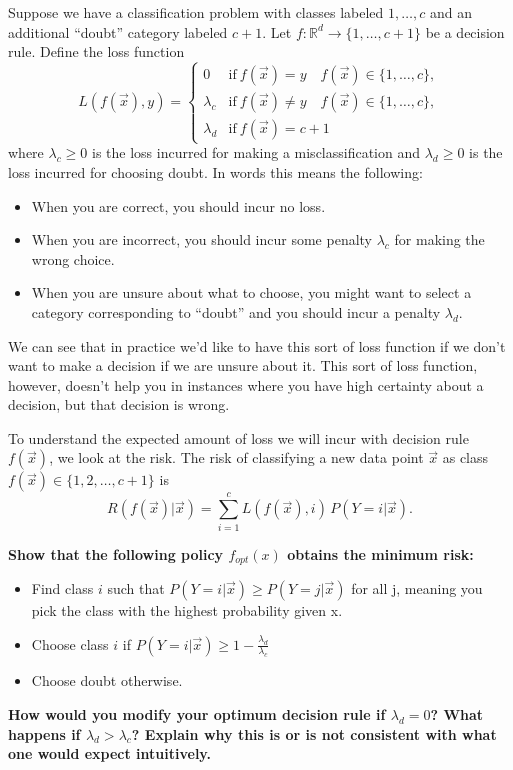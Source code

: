 \documentclass[preview]{standalone}
\begin{document}
Suppose we have a classification problem with classes labeled $1, \dotsc, c$ and an additional ``doubt'' category labeled $c+1$. Let $f : \mathbb{R}^d \to \{1, \dots, c+1 \}$ be a decision rule. Define the loss function
\begin{equation}
L(f(\vec{x}), y) =
\begin{cases}
0 &  						 \mathrm{if}\ f(\vec{x})=y \quad f(\vec{x}) \in\{1,\dotsc,c\}, \\
\lambda_c       & \mathrm{if}\ f(\vec{x})\neq y \quad f(\vec{x}) \in \{1,\dotsc,c\}, \\
\lambda_d       & \mathrm{if}\ f(\vec{x})=c+1
\end{cases}
\end{equation}
where $\lambda_c \geq 0$ is the loss incurred for making a misclassification and $\lambda_d \geq 0$ is the loss incurred for choosing doubt. In words this means the following:
\begin{itemize}
	\item When you are correct, you should incur no loss.
	\item When you are incorrect, you should incur some penalty $\lambda_c$ for making the wrong choice.
	\item When you are unsure about what to choose, you might want to select a category corresponding to ``doubt'' and you should incur a penalty $\lambda_d$.
\end{itemize}

We can see that in practice we'd like to have this sort of loss
function if we don't want to make a decision if we are unsure about
it. This sort of loss function, however, doesn't help you in instances
where you have high certainty about a decision, but that decision is wrong.

To understand the expected amount of loss we will incur with decision rule $f(\vec{x})$, we look at the risk. The risk of classifying a new data point $\vec{x}$ as class $f(\vec{x}) \in \{1,2,\dots,c+1\}$ is
$$R(f(\vec{x})|\vec{x}) = \sum_{i=1}^{c} L(f(\vec{x}), i) \, P(Y=i|\vec{x}).$$

\begin{Parts}

	\Part \textbf{Show that the following policy $f_{opt}(x)$ obtains the minimum risk:}
	\begin{itemize}
		\item Find class $i$ such that $P(Y=i|\vec{x}) \geq P(Y=j|\vec{x})$ for all j, meaning you pick the class with the highest probability given x.
		\item Choose class $i$ if $P(Y=i|\vec{x}) \geq 1 - \frac{\lambda_d}{\lambda_c}$ 
		\item Choose doubt otherwise.
	\end{itemize}

	

	\Part \textbf{How would you modify your optimum decision rule if $\lambda_d=0$?  What happens if $\lambda_d>\lambda_c$? Explain why this is or is not consistent with what one would expect intuitively.}

	

\end{Parts}
\end{document}
